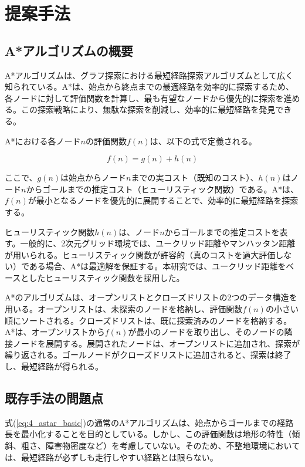 \chapter{提案手法}

\section{A*アルゴリズムの概要}

A*アルゴリズムは、グラフ探索における最短経路探索アルゴリズムとして広く知られている。A*は、始点から終点までの最適経路を効率的に探索するため、各ノードに対して評価関数を計算し、最も有望なノードから優先的に探索を進める。この探索戦略により、無駄な探索を削減し、効率的に最短経路を発見できる。

A*における各ノード$n$の評価関数$f(n)$は、以下の式で定義される。

\begin{equation}
f(n) = g(n) + h(n)
\label{eq:4_astar_basic}
\end{equation}

ここで、$g(n)$は始点からノード$n$までの実コスト（既知のコスト）、$h(n)$はノード$n$からゴールまでの推定コスト（ヒューリスティック関数）である。A*は、$f(n)$が最小となるノードを優先的に展開することで、効率的に最短経路を探索する。

ヒューリスティック関数$h(n)$は、ノード$n$からゴールまでの推定コストを表す。一般的に、2次元グリッド環境では、ユークリッド距離やマンハッタン距離が用いられる。ヒューリスティック関数が許容的（真のコストを過大評価しない）である場合、A*は最適解を保証する。本研究では、ユークリッド距離をベースとしたヒューリスティック関数を採用した。

A*のアルゴリズムは、オープンリストとクローズドリストの2つのデータ構造を用いる。オープンリストは、未探索のノードを格納し、評価関数$f(n)$の小さい順にソートされる。クローズドリストは、既に探索済みのノードを格納する。A*は、オープンリストから$f(n)$が最小のノードを取り出し、そのノードの隣接ノードを展開する。展開されたノードは、オープンリストに追加され、探索が繰り返される。ゴールノードがクローズドリストに追加されると、探索は終了し、最短経路が得られる。

\section{既存手法の問題点}

式(\ref{eq:4_astar_basic})の通常のA*アルゴリズムは、始点からゴールまでの経路長を最小化することを目的としている。しかし、この評価関数は地形の特性（傾斜、粗さ、障害物密度など）を考慮していない。そのため、不整地環境においては、最短経路が必ずしも走行しやすい経路とは限らない。

